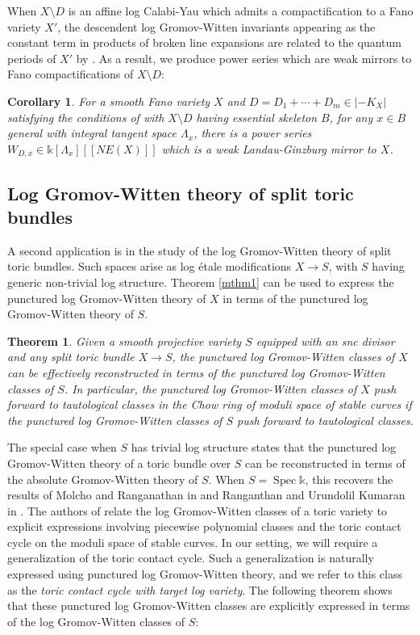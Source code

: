 \documentclass[12pt, oneside]{amsart}   	%
\newcounter{thm}
\newtheorem{theorem}[thm]{Theorem}
\newtheorem{corollary}[thm]{Corollary}
\newcommand{\kk}{\mathds{k}}
\newcommand{\Spec}{\operatorname{Spec}}
\numberwithin{equation}{section}
\numberwithin{thm}{section}
\numberwithin{figure}{section}
\begin{document}
When $X\setminus D$ is an affine log Calabi-Yau which admits a compactification to a Fano variety $X'$, the descendent log Gromov-Witten invariants appearing as the constant term in products of broken line expansions are related to the quantum periods of $X'$ by \cite[Theorem $1.1$]{qpint}. As a result, we produce power series which are weak mirrors to Fano compactifications of $X\setminus D$:

\begin{corollary}\label{fanocor}
For a smooth Fano variety $X$ and $D = D_1+\cdots+D_m \in |-K_X|$ satisfying the conditions of \cite[Theorem $1.1$]{qpint} with $X\setminus D$ having essential skeleton $B$, for any $x \in B$ general with integral tangent space $\Lambda_x$, there is a power series $W_{D,x} \in \kk[\Lambda_x][[NE(X)]]$ which is a weak Landau-Ginzburg mirror to $X$. 
\end{corollary}

\subsection{Log Gromov-Witten theory of split toric bundles}

A second application is in the study of the log Gromov-Witten theory of split toric bundles. Such spaces arise as log \'etale modifications $X \rightarrow S$, with $S$ having generic non-trivial log structure. Theorem \ref{mthm1} can be used to express the punctured log Gromov-Witten theory of $X$ in terms of the punctured log Gromov-Witten theory of $S$. 


\begin{theorem}\label{mthm2}
Given a smooth projective variety $S$ equipped with an snc divisor and any split toric bundle $X \rightarrow S$, the punctured log Gromov-Witten classes of $X$ can be effectively reconstructed in terms of the punctured log Gromov-Witten classes of $S$. In particular, the punctured log Gromov-Witten classes of $X$ push forward to tautological classes in the Chow ring of moduli space of stable curves if the punctured log Gromov-Witten classes of $S$ push forward to tautological classes. 
\end{theorem}

The special case when $S$ has trivial log structure states that the punctured log Gromov-Witten theory of a toric bundle over $S$ can be reconstructed in terms of the absolute Gromov-Witten theory of $S$. When $S = \Spec \kk$, this recovers the results of Molcho and Ranganathan in \cite{logint} and Ranganthan and Urundolil Kumaran in \cite{DRtoric}. The authors of \cite{DRtoric} relate the log Gromov-Witten classes of a toric variety to explicit expressions involving piecewise polynomial classes and the toric contact cycle on the moduli space of stable curves. In our setting, we will require a generalization of the toric contact cycle. Such a generalization is naturally expressed using punctured log Gromov-Witten theory, and we refer to this class as the \emph{toric contact cycle with target log variety}. The following theorem shows that these punctured log Gromov-Witten classes are explicitly expressed in terms of the log Gromov-Witten classes of $S$:
\end{document}
